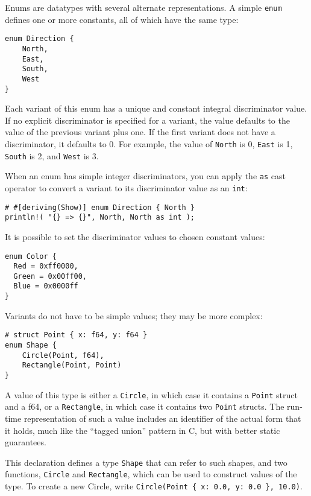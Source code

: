 \documentclass[]{article}
\begin{document}
Enums are datatypes with several alternate representations. A simple
\texttt{enum} defines one or more constants, all of which have the same
type:

\begin{verbatim}
enum Direction {
    North,
    East,
    South,
    West
}
\end{verbatim}

Each variant of this enum has a unique and constant integral
discriminator value. If no explicit discriminator is specified for a
variant, the value defaults to the value of the previous variant plus
one. If the first variant does not have a discriminator, it defaults to
0. For example, the value of \texttt{North} is 0, \texttt{East} is 1,
\texttt{South} is 2, and \texttt{West} is 3.

When an enum has simple integer discriminators, you can apply the
\texttt{as} cast operator to convert a variant to its discriminator
value as an \texttt{int}:

\begin{verbatim}
# #[deriving(Show)] enum Direction { North }
println!( "{} => {}", North, North as int );
\end{verbatim}

It is possible to set the discriminator values to chosen constant
values:

\begin{verbatim}
enum Color {
  Red = 0xff0000,
  Green = 0x00ff00,
  Blue = 0x0000ff
}
\end{verbatim}

Variants do not have to be simple values; they may be more complex:

\begin{verbatim}
# struct Point { x: f64, y: f64 }
enum Shape {
    Circle(Point, f64),
    Rectangle(Point, Point)
}
\end{verbatim}

A value of this type is either a \texttt{Circle}, in which case it
contains a \texttt{Point} struct and a f64, or a \texttt{Rectangle}, in
which case it contains two \texttt{Point} structs. The run-time
representation of such a value includes an identifier of the actual form
that it holds, much like the ``tagged union'' pattern in C, but with
better static guarantees.

This declaration defines a type \texttt{Shape} that can refer to such
shapes, and two functions, \texttt{Circle} and \texttt{Rectangle}, which
can be used to construct values of the type. To create a new Circle,
write \texttt{Circle(Point \{ x: 0.0, y: 0.0 \}, 10.0)}.
\end{document}
